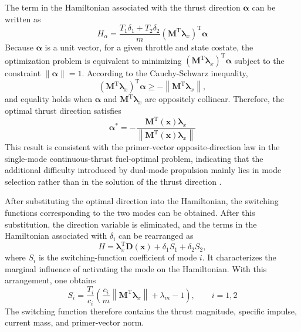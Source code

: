 ﻿\documentclass{IEEEtaes}
\begin{document}
The term in the Hamiltonian associated with the thrust direction $\bm{\alpha}$ can be written as
\begin{equation}
H_{\alpha}=\frac{T_1\delta_1+T_2\delta_2}{m}\left(\bm{M}^{\mathrm{T}}\bm{\lambda}_x\right)^{\mathrm{T}}\bm{\alpha}
\end{equation}
Because $\bm{\alpha}$ is a unit vector, for a given throttle and state costate, the optimization problem is equivalent to minimizing $\left(\bm{M}^{\mathrm{T}}\bm{\lambda}_x\right)^{\mathrm{T}}\bm{\alpha}$ subject to the constraint $\|\bm{\alpha}\|=1$. According to the Cauchy-Schwarz inequality,
\begin{equation}
\left(\bm{M}^{\mathrm{T}}\bm{\lambda}_x\right)^{\mathrm{T}}\bm{\alpha}\geq-\left\|\bm{M}^{\mathrm{T}}\bm{\lambda}_x\right\|,
\end{equation}
and equality holds when $\bm{\alpha}$ and $\bm{M}^{\mathrm{T}}\bm{\lambda}_x$ are oppositely collinear. Therefore, the optimal thrust direction satisfies
\begin{equation}
\bm{\alpha}^{*}=-\frac{\bm{M}^{\mathrm{T}}(\bm{x})\bm{\lambda}_x}{\left\|\bm{M}^{\mathrm{T}}(\bm{x})\bm{\lambda}_x\right\|}
\end{equation}
This result is consistent with the primer-vector opposite-direction law in the single-mode continuous-thrust fuel-optimal problem, indicating that the additional difficulty introduced by dual-mode propulsion mainly lies in mode selection rather than in the solution of the thrust direction \cite{chi2022,taheri2020a,cline2024a}.

After substituting the optimal direction into the Hamiltonian, the switching functions corresponding to the two modes can be obtained. After this substitution, the direction variable is eliminated, and the terms in the Hamiltonian associated with $\delta_i$ can be rearranged as
\begin{equation}
H=\bm{\lambda}_x^{\mathrm{T}}\bm{D}(\bm{x})+\delta_1S_1+\delta_2S_2,
\end{equation}
where $S_i$ is the switching-function coefficient of mode $i$. It characterizes the marginal influence of activating the mode on the Hamiltonian. With this arrangement, one obtains
\begin{equation}
S_i=\frac{T_i}{c_i}\left(\frac{c_i}{m}\left\|\bm{M}^{\mathrm{T}}\bm{\lambda}_x\right\|+\lambda_m-1\right),\qquad i=1,2
\end{equation}
The switching function therefore contains the thrust magnitude, specific impulse, current mass, and primer-vector norm.
\end{document}
